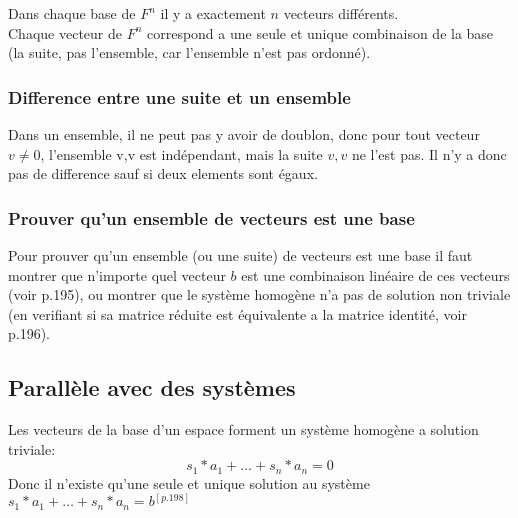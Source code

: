 \documentclass[12pt]{article}
\begin{document}
Dans chaque base de $F^{n}$ il y a exactement $n$ vecteurs différents.\\

Chaque vecteur de $F^{n}$ correspond a une seule et unique combinaison de la base (la suite, pas l'ensemble, car l'ensemble n'est pas ordonné). \\

\subsubsection{Difference entre une suite et un ensemble}
Dans un ensemble, il ne peut pas y avoir de doublon, donc pour tout vecteur $v \neq 0$, l'ensemble {v,v} est indépendant, mais la suite $v,v$ ne l'est pas. Il n'y a donc pas de difference sauf si deux elements sont égaux.
  
\subsubsection{Prouver qu'un ensemble de vecteurs est une base}
Pour prouver qu'un ensemble (ou une suite) de vecteurs est une base il faut montrer que n'importe quel vecteur $b$ est une combinaison linéaire de ces vecteurs (voir p.195), ou montrer que le système homogène n'a pas de solution non triviale (en verifiant si sa matrice réduite est équivalente a la matrice identité, voir p.196). 

\subsection{Parallèle avec des systèmes}
Les vecteurs de la base d'un espace forment un système homogène a solution triviale: 
\begin{equation}
  s_1*a_1 + \ldots + s_n * a_n = 0
\end{equation}
Donc il n'existe qu'une seule et unique solution au système $s_1*a_1 + \ldots + s_n * a_n = b$$^{[p.198]}$ 
  
\end{document}

